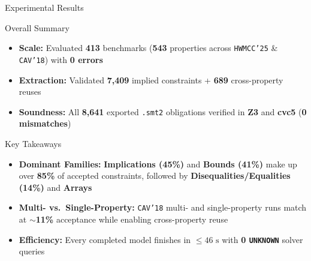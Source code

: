 \documentclass[aspectratio=169,xcolor=dvipsnames]{beamer}
\begin{document}

\begin{frame}{Experimental Results}

  \begin{block}{Overall Summary}
    \small
    \begin{itemize}
        \setlength\itemsep{0.2em}
      \item \textbf{Scale:} Evaluated \textbf{413} benchmarks (\textbf{543} properties across \texttt{HWMCC'25} \& \texttt{CAV'18}) with \textbf{0 errors}
      \item \textbf{Extraction:} Validated \textbf{7,409} implied constraints + \textbf{689} cross-property reuses
      \item \textbf{Soundness:} All \textbf{8,641} exported \texttt{.smt2} obligations verified in \textbf{Z3} and \textbf{cvc5} (\textbf{0 mismatches})
    \end{itemize}
  \end{block}

  \vspace{0.15em}

  \begin{exampleblock}{Key Takeaways}
    \small
    \begin{itemize}
        \setlength\itemsep{0.2em}
      \item \textbf{Dominant Families:} \textbf{Implications (45\%)} and \textbf{Bounds (41\%)} make up over \textbf{85\%} of accepted constraints, followed by \textbf{Disequalities/Equalities (14\%)} and \textbf{Arrays}
      \item \textbf{Multi- vs.\ Single-Property:} \texttt{CAV'18} multi- and single-property runs match at \textbf{$\sim$11\%} acceptance while enabling cross-property reuse
      \item \textbf{Efficiency:} Every completed model finishes in \textbf{$\le 46\text{ s}$} with \textbf{0 \texttt{UNKNOWN}} solver queries
    \end{itemize}
  \end{exampleblock}

  \vspace{0.15em}
  \centering
  \href{https://github.com/MJLiiii/Btor2Sieve}{}

\end{frame}

\end{document}
